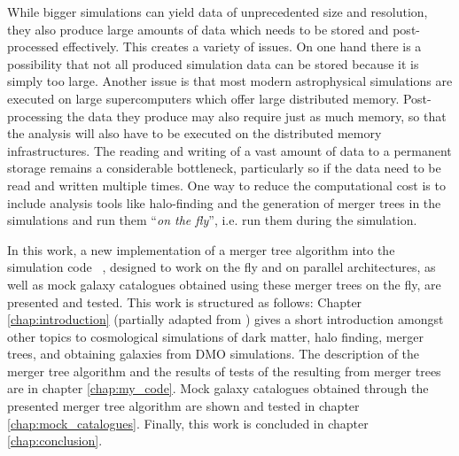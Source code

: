 While bigger simulations can yield data of unprecedented size and resolution, they also produce large amounts of data which needs to be stored and post-processed effectively.   
This creates a variety of issues.
On one hand there is a possibility that not all produced simulation data can be stored because it is simply too large. 
Another issue is that most modern astrophysical simulations are executed on large supercomputers which offer large distributed memory. 
Post-processing the data they produce may also require just as much memory, so that the analysis will also have to be executed on the distributed memory infrastructures.
The reading and writing of a vast amount of data to a permanent storage remains a considerable bottleneck, particularly so if the data need to be read and written multiple times.
One way to reduce the computational cost is to include analysis tools like halo-finding and the generation of merger trees in the simulations and run them ``\textit{on the fly}'', i.e. run them during the simulation. 


In this work, a new implementation of a merger tree algorithm into the simulation code \ramses\ \parencite{ramses}, designed to work on the fly and on parallel architectures, as well as mock galaxy catalogues obtained using these merger trees on the fly, are presented and tested.
This work is structured as follows:
Chapter \ref{chap:introduction} (partially adapted from \cite{bachelor_thesis}) gives a short introduction amongst other topics to cosmological simulations of dark matter, halo finding, merger trees, and obtaining galaxies from DMO simulations.
The description of the merger tree algorithm and the results of tests of the resulting from merger trees are in chapter \ref{chap:my_code}.
Mock galaxy catalogues obtained through the presented merger tree algorithm are shown and tested in chapter \ref{chap:mock_catalogues}.
Finally, this work is concluded in chapter \ref{chap:conclusion}.